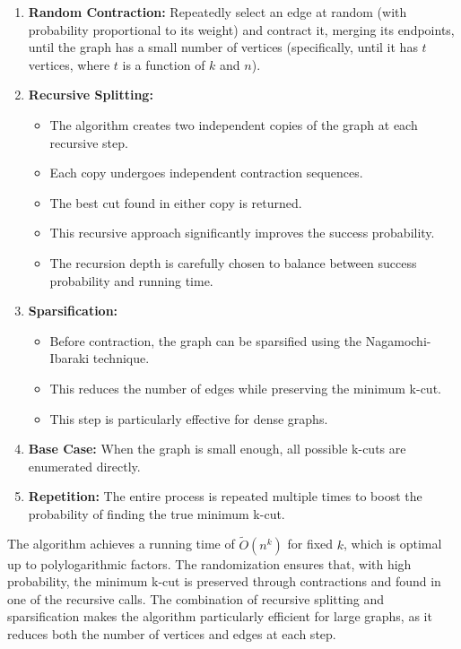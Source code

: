 \documentclass[11pt]{article}
\begin{document}
\begin{enumerate}
    \item \textbf{Random Contraction:} Repeatedly select an edge at random (with probability proportional to its weight) and contract it, merging its endpoints, until the graph has a small number of vertices (specifically, until it has \( t \) vertices, where \( t \) is a function of \( k \) and \( n \)).
    
    \item \textbf{Recursive Splitting:}
    \begin{itemize}
        \item The algorithm creates two independent copies of the graph at each recursive step.
        \item Each copy undergoes independent contraction sequences.
        \item The best cut found in either copy is returned.
        \item This recursive approach significantly improves the success probability.
        \item The recursion depth is carefully chosen to balance between success probability and running time.
    \end{itemize}
    
    \item \textbf{Sparsification:}
    \begin{itemize}
        \item Before contraction, the graph can be sparsified using the Nagamochi-Ibaraki technique.
        \item This reduces the number of edges while preserving the minimum k-cut.
        \item This step is particularly effective for dense graphs.
    \end{itemize}
    
    \item \textbf{Base Case:} When the graph is small enough, all possible k-cuts are enumerated directly.
    
    \item \textbf{Repetition:} The entire process is repeated multiple times to boost the probability of finding the true minimum k-cut.
\end{enumerate}

The algorithm achieves a running time of \( \tilde{O}(n^k) \) for fixed \( k \), which is optimal up to polylogarithmic factors. The randomization ensures that, with high probability, the minimum k-cut is preserved through contractions and found in one of the recursive calls. The combination of recursive splitting and sparsification makes the algorithm particularly efficient for large graphs, as it reduces both the number of vertices and edges at each step.
\end{document}
